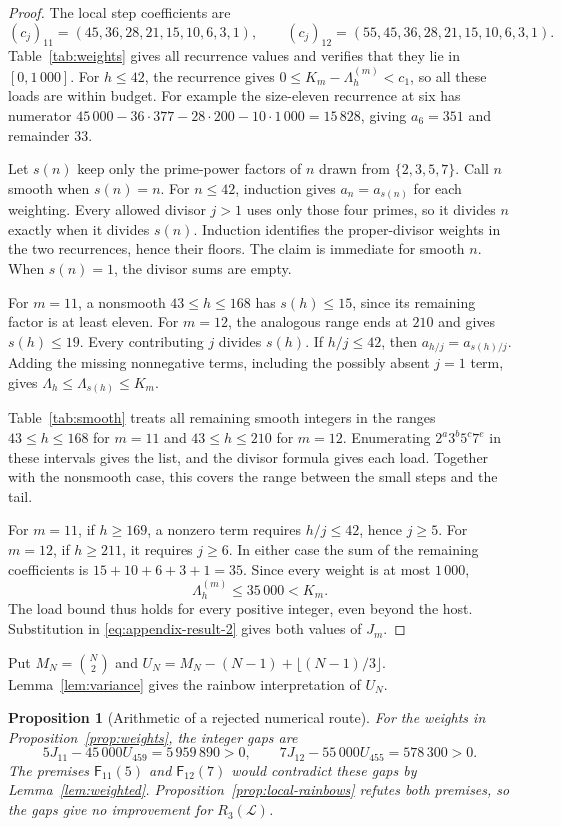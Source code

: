 \documentclass[11pt,a4paper]{article}
\newif\ifshowrevisions
\newcommand{\rev}[1]{{\ifshowrevisions\color{red}\fi #1}}
\newtheorem{proposition}[theorem]{Proposition}
\theoremstyle{definition}
\newcommand{\Lconf}{\mathcal L}
\newcommand{\F}{\mathsf F}
\numberwithin{equation}{section}
\begin{document}
\begin{proof}
	The local step coefficients are
	\[
	(c_j)_{11}=(45,36,28,21,15,10,6,3,1),\qquad
	(c_j)_{12}=(55,45,36,28,21,15,10,6,3,1).
	\]
	Table~\ref{tab:weights} gives all recurrence values and verifies that they lie in $[0,1\,000]$. For $h\le42$, the recurrence gives $0\le K_m-\Lambda_h^{(m)}<c_1$, so all these loads are within budget. For example the size-eleven recurrence at six has numerator $45\,000-36\cdot377-28\cdot200-10\cdot1\,000=15\,828$, giving $a_6=351$ and remainder $33$.
	
	Let $s(n)$ keep only the prime-power factors of $n$ drawn from $\{2,3,5,7\}$. Call $n$ smooth when $s(n)=n$. For $n\le42$, induction gives $a_n=a_{s(n)}$ for each weighting. Every allowed divisor $j>1$ uses only those four primes, so it divides $n$ exactly when it divides $s(n)$. Induction identifies the proper-divisor weights in the two recurrences, hence their floors. The claim is immediate for smooth $n$. When $s(n)=1$, the divisor sums are empty.
	
	For $m=11$, a nonsmooth $43\le h\le168$ has $s(h)\le15$, since its remaining factor is at least eleven. For $m=12$, the analogous range ends at $210$ and gives $s(h)\le19$. Every contributing $j$ divides $s(h)$. If $h/j\le42$, then $a_{h/j}=a_{s(h)/j}$. Adding the missing nonnegative terms, including the possibly absent $j=1$ term, gives $\Lambda_h\le\Lambda_{s(h)}\le K_m$.
	
	\rev{Table~\ref{tab:smooth} treats all remaining smooth integers} in the ranges $43\le h\le168$ for $m=11$ and $43\le h\le210$ for $m=12$. Enumerating $2^a3^b5^c7^e$ in these intervals gives the list, and the divisor formula gives each load. Together with the nonsmooth case, this covers the range between the small steps and the tail.
	
	For $m=11$, if $h\ge169$, a nonzero term requires $h/j\le42$, hence $j\ge5$. For $m=12$, if $h\ge211$, it requires $j\ge6$. In either case the sum of the remaining coefficients is $15+10+6+3+1=35$. Since every weight is at most $1\,000$,
	\[
	\Lambda_h^{(m)}\le35\,000<K_m.
	\]
	The load bound thus holds for every positive integer, even beyond the host. Substitution in \eqref{eq:appendix-result-2} gives both values of $J_m$.
\end{proof}

Put $M_N=\binom N2$ and $U_N=M_N-(N-1)+\lfloor(N-1)/3\rfloor$. Lemma~\ref{lem:variance} gives the rainbow interpretation of $U_N$.
\FloatBarrier
{}
\begin{proposition}[Arithmetic of a rejected numerical route]\label{thm:weighted}
	For the weights in Proposition~\ref{prop:weights}, the integer gaps are
\begin{equation}\label{eq:appendix-result-3}
5J_{11}-45\,000U_{459}=5\,959\,890>0,\qquad
7J_{12}-55\,000U_{455}=578\,300>0.
\end{equation}
The premises $\F_{11}(5)$ and $\F_{12}(7)$ would contradict these gaps by Lemma~\ref{lem:weighted}. Proposition~\ref{prop:local-rainbows} refutes both premises, so the gaps give no improvement for $R_3(\Lconf)$.
\end{proposition}
\end{document}
